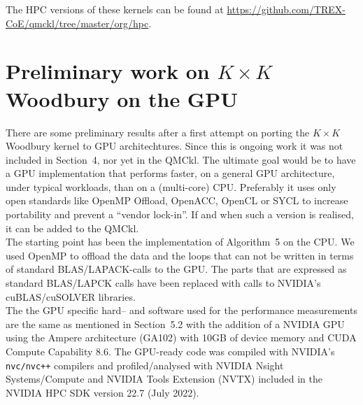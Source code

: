 \documentclass[11pt]{article}
\numberwithin{figure}{section}
\numberwithin{table}{section}
\begin{document}
    The HPC versions of these kernels can be found at \url{https://github.com/TREX-CoE/qmckl/tree/master/org/hpc}.
  
  \section{Preliminary work on $K\times K$ Woodbury on the GPU}
    There are some preliminary results after a first attempt on porting the $K\times K$ Woodbury kernel to GPU architechtures. Since this is ongoing work it was not included in Section~4, nor yet in the QMCkl. The ultimate goal would be to have a GPU implementation that performs faster, on a general GPU architecture,  under typical workloads, than on a (multi-core) CPU. Preferably it uses only open standards like OpenMP Offload, OpenACC, OpenCL or SYCL to increase portability and prevent a ``vendor lock-in''. If and when such a version is realised, it can be added to the QMCkl.\\
      
    The starting point has been the implementation of Algorithm~5 on the CPU. We used OpenMP to offload the data and the loops that can not be written in terms of standard BLAS/LAPACK-calls to the GPU. The parts that are expressed as standard BLAS/LAPCK calls have been replaced with calls to NVIDIA's cuBLAS/cuSOLVER libraries.\\
    
    The the GPU specific hard-- and software used for the performance measurements are the same as mentioned in Section~5.2 with the addition of a NVIDIA GPU using the Ampere architecture (GA102) with 10GB of device memory and CUDA Compute Capability 8.6. The GPU-ready code was compiled with NVIDIA's \texttt{nvc/nvc++} compilers and profiled/analysed with NVIDIA Nsight Systems/Compute and NVIDIA Tools Extension (NVTX) included in the NVIDIA HPC SDK version 22.7 (July 2022).
  
\end{document}
